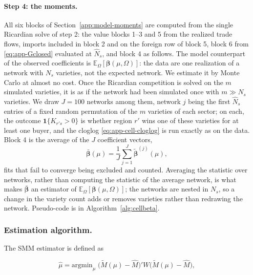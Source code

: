 \paragraph{Step 4: the moments.} All six blocks of Section~\ref{app:model-moments} are computed from the single Ricardian solve of step 2: the value blocks 1--3 and 5 from the realized trade flows, imports included in block 2 and on the foreign row of block 5, block 6 from \eqref{eq:app-Gclosed} evaluated at $\hat N_{s}$, and block 4 as follows. The model counterpart of the observed coefficients is $\mathbb{E}_\Omega[\boldsymbol\beta(\mu,\Omega)]$: the data are one realization of a network with $N_s$ varieties, not the expected network. We estimate it by Monte Carlo at almost no cost. Once the Ricardian competition is solved on the $m$ simulated varieties, it is as if the network had been simulated once with $m\gg N_s$ varieties. We draw $J=100$ networks among them, network $j$ being the first $\hat N_s$ entries of a fixed random permutation of the $m$ varieties of each sector; on each, the outcome $\mathbf{1}\{K_{r's}>0\}$ is whether region $r'$ wins one of these varieties for at least one buyer, and the cloglog \eqref{eq:app-cell-cloglog} is run exactly as on the data. Block 4 is the average of the $J$ coefficient vectors,
\begin{equation}
\bar{\boldsymbol\beta}(\mu)=\frac{1}{J}\sum_{j=1}^{J}\tilde{\boldsymbol\beta}^{(j)}(\mu),
\label{eq:app-beta-mc}
\end{equation}
fits that fail to converge being excluded and counted. Averaging the statistic over networks, rather than computing the statistic of the average network, is what makes $\bar{\boldsymbol\beta}$ an estimator of $\mathbb{E}_\Omega[\boldsymbol\beta(\mu,\Omega)]$; the networks are nested in $N_s$, so a change in the variety count adds or removes varieties rather than redrawing the network. Pseudo-code is in Algorithm~\ref{alg:cellbeta}.


\subsubsection{Estimation algorithm.} The SMM estimator is defined as

\begin{equation}
\hat\mu=\text{argmin}_{\mu}\;\big(\tilde M(\mu)-\hat M\big)'W\big(\tilde M(\mu)-\hat M\big),
\label{eq:app-smm}
\end{equation}

